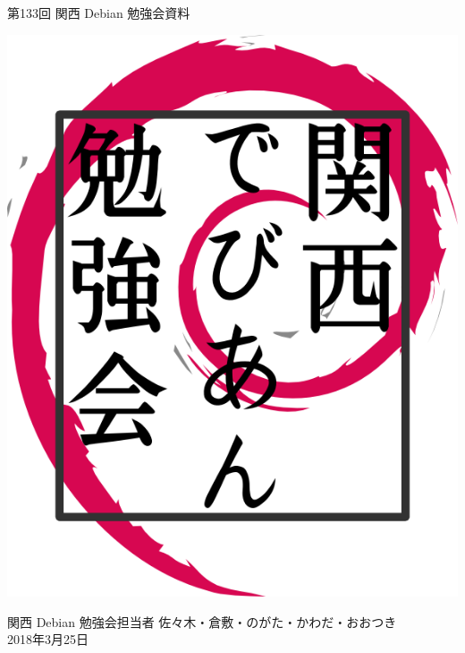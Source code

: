 \documentclass[mingoth,a4paper]{jsarticle}
\newcommand{\debmtgyear}{2018}
\newcommand{\debmtgdate}{25}
\newcommand{\debmtgmonth}{3}
\newcommand{\debmtgnumber}{133}
\begin{document}
\begin{titlepage}


 第\debmtgnumber{}回 関西 Debian 勉強会資料

\vspace{2cm}

\begin{center}
\includegraphics{image200802/kansaidebianlogo.png}
\end{center}

\begin{flushright}
\hfill{}関西 Debian 勉強会担当者 佐々木・倉敷・のがた・かわだ・おおつき \\
\hfill{}\debmtgyear{}年\debmtgmonth{}月\debmtgdate{}日
\end{flushright}

\thispagestyle{empty}
\end{titlepage}

\end{document}
